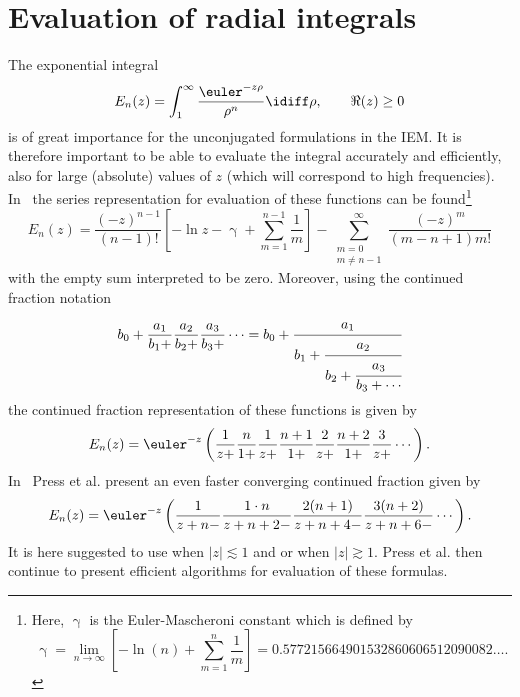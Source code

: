 \section{Evaluation of radial integrals}
\label{Sec2:radIntegrals}
The exponential integral
\begin{equation}
	E_n(z) = \int_1^\infty \frac{\euler^{-z\rho}}{\rho^n}\idiff \rho,\qquad \Re(z) \geq 0
\end{equation}
is of great importance for the unconjugated formulations in the IEM. It is therefore important to be able to evaluate the integral accurately and efficiently, also for large (absolute) values of $z$ (which will correspond to high frequencies). In~\cite[p. 229, 5.1.12]{Abramowitz1965hom} the series representation for evaluation of these functions can be found\footnote{Here, $\upgamma$ is the Euler-Mascheroni constant which is defined by 
\begin{equation*}
\upgamma  = \lim_{n\to\infty}\left[-\ln(n)+\sum_{m=1}^n \frac{1}{m}\right]=0.577215664901532860606512090082\dots.
\end{equation*}}
\begin{equation}\label{Eq2:seriesRepresentation}
	E_n(z) = \frac{(-z)^{n-1}}{(n-1)!}\left[-\ln z-\upgamma+\sum_{m=1}^{n-1}\frac{1}{m}\right] -\sum_{\substack{m=0\\m\neq n-1}}^\infty \frac{(-z)^m}{(m-n+1)m!}
\end{equation}
with the empty sum interpreted to be zero. Moreover, using the continued fraction notation
\begin{equation}
	b_0+\frac{a_1}{b_1+}\frac{a_2}{b_2+}\frac{a_3}{b_3+}\cdots = b_0+\cfrac{a_1}{b_1+\cfrac{a_2}{b_2+\cfrac{a_3}{b_3+\cdots}}}
\end{equation}
the continued fraction representation of these functions is given by~\cite[p. 229, 5.1.22]{Abramowitz1965hom}
\begin{equation}\label{Eq2:contFracRepresentation}
	E_n(z) = \euler^{-z}\left(\frac{1}{z+}\frac{n}{1+}\frac{1}{z+}\frac{n+1}{1+}\frac{2}{z+}\frac{n+2}{1+}\frac{3}{z+}\cdots\right).
\end{equation}
In~\cite[p. 222]{Press1988nri} Press et al. present an even faster converging continued fraction given by
\begin{equation}\label{Eq2:contFracRepresentation2}
	E_n(z) = \euler^{-z}\left(\frac{1}{z+n-}\frac{1\cdot n}{z+n+2-}\frac{2(n+1)}{z+n+4-}\frac{3(n+2)}{z+n+6-}\cdots\right).
\end{equation}
It is here suggested to use  when $|z|\lesssim 1$ and  or  when $|z|\gtrsim 1$. Press et al. then continue to present efficient algorithms for evaluation of these formulas.

